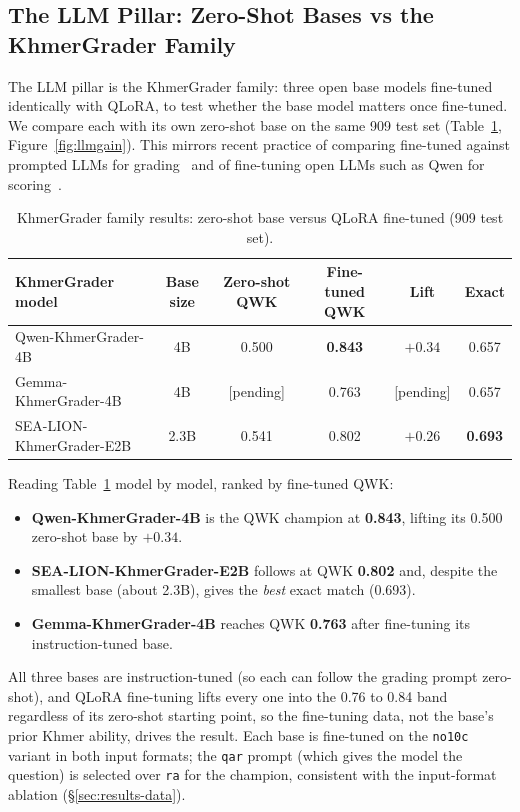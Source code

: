 \subsection{The LLM Pillar: Zero-Shot Bases vs the KhmerGrader Family}
\label{sec:results-llm}
The LLM pillar is the KhmerGrader family: three open base models fine-tuned identically with QLoRA, to
test whether the base model matters once fine-tuned. We compare each with its own zero-shot base on the
same 909 test set (Table~\ref{tab:llmfamily}, Figure~\ref{fig:llmgain}). This mirrors recent practice
of comparing fine-tuned against prompted LLMs for grading~\citep{lachana2025dutch,latif2024finetuning}
and of fine-tuning open LLMs such as Qwen for scoring~\citep{xu2025qwenscore}.

\begin{table}[t]
\centering
\caption[KhmerGrader family results: zero-shot vs.\ fine-tuned]{KhmerGrader family results: zero-shot base versus QLoRA fine-tuned (909 test set).}
\label{tab:llmfamily}
\small
\begin{tabular}{@{}lccccc@{}}
\toprule
KhmerGrader model & Base size & Zero-shot QWK & Fine-tuned QWK & Lift & Exact \\
\midrule
Qwen-KhmerGrader-4B       & 4B   & 0.500    & \textbf{0.843} & $+0.34$ & 0.657 \\
Gemma-KhmerGrader-4B      & 4B   & [pending] & 0.763          & [pending] & 0.657 \\
SEA-LION-KhmerGrader-E2B  & 2.3B & 0.541    & 0.802          & $+0.26$ & \textbf{0.693} \\
\bottomrule
\end{tabular}
\end{table}

Reading Table~\ref{tab:llmfamily} model by model, ranked by fine-tuned QWK:
\begin{itemize}[leftmargin=1.4em]
  \item \textbf{Qwen-KhmerGrader-4B} is the QWK champion at \textbf{0.843}, lifting its 0.500 zero-shot
  base by $+0.34$.
  \item \textbf{SEA-LION-KhmerGrader-E2B} follows at QWK \textbf{0.802} and, despite the smallest base
  (about 2.3B), gives the \emph{best} exact match (0.693).
  \item \textbf{Gemma-KhmerGrader-4B} reaches QWK \textbf{0.763} after fine-tuning its
  instruction-tuned base.
\end{itemize}
All three bases are instruction-tuned (so each can follow the grading prompt zero-shot), and QLoRA
fine-tuning lifts every one into the 0.76 to 0.84 band regardless of its zero-shot starting point, so
the fine-tuning data, not the base's prior Khmer ability, drives the result. Each base is fine-tuned on
the \texttt{no10c} variant in both input formats; the \texttt{qar} prompt (which gives the model the
question) is selected over \texttt{ra} for the champion, consistent with the input-format ablation
(\S\ref{sec:results-data}).

